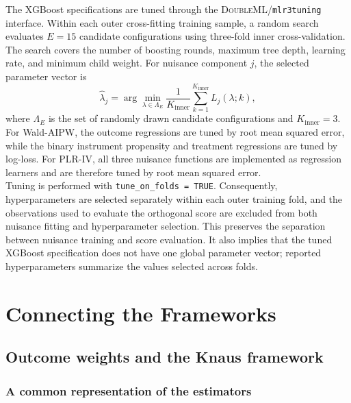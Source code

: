 \documentclass[12pt, a4paper, oneside]{article}
\theoremstyle{plain}
\theoremstyle{definition}
\begin{document}
The XGBoost specifications are tuned through the
\textsc{DoubleML}/\texttt{mlr3tuning} interface. Within each outer
cross-fitting training sample, a random search evaluates
\(E=15\) candidate configurations using three-fold inner cross-validation.
The search covers the number of boosting rounds, maximum tree depth, learning
rate, and minimum child weight.
For nuisance component \(j\), the selected parameter vector is
\begin{equation}
    \widehat{\lambda}_j
    =
    \arg\min_{\lambda \in \Lambda_E}
    \frac{1}{K_{\mathrm{inner}}}
    \sum_{k=1}^{K_{\mathrm{inner}}}
    L_j(\lambda;k),
\end{equation}
where \(\Lambda_E\) is the set of randomly drawn candidate configurations and
\(K_{\mathrm{inner}}=3\).\\
For Wald-AIPW, the outcome regressions are tuned by root mean squared error,
while the binary instrument propensity and treatment regressions are tuned by
log-loss. For PLR-IV, all three nuisance functions are implemented as
regression learners and are therefore tuned by root mean squared error.\\
Tuning is performed with \texttt{tune\_on\_folds = TRUE}. Consequently,
hyperparameters are selected separately within each outer training fold, and
the observations used to evaluate the orthogonal score are excluded from both
nuisance fitting and hyperparameter selection. This preserves the separation
between nuisance training and score evaluation. It also implies that the tuned
XGBoost specification does not have one global parameter vector; reported
hyperparameters summarize the values selected across folds.







\section{Connecting the Frameworks}
\label{sec:connecting_frameworks}


\subsection{Outcome weights and the Knaus framework}
\label{subsec:knaus_framework}

\subsubsection{A common representation of the estimators}
\end{document}
